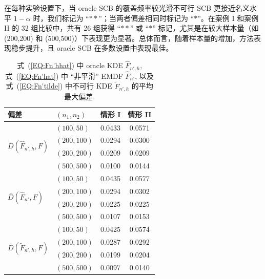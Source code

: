 \documentclass[a4paper,openay,14pt]{ctexbook}
\numberwithin{equation}{section}
\numberwithin{lem}{section}
\begin{document}
在每种实验设置下，当 oracle SCB 的覆盖频率较光滑不可行 SCB 更接近名义水平 \(1-\alpha\) 时，我们标记为 “$\ast\ast$”；当两者偏差相同时标记为 “$\ast$”。在案例 I 和案例 II 的 32 组比较中，共有 26 组获得 “$\ast\ast$” 或 “$\ast$” 标记，尤其是在较大样本量（如 (200,200) 和 (500,500)）下表现更为显著。总体而言，随着样本量的增加，方法表现稳步提升，且 oracle SCB 在多数设置中表现最佳。
{
\setlength{\tabcolsep}{10pt}
\renewcommand{\arraystretch}{1.3}
\begin{table}[htbp]
    \centering
    \caption{式~(\ref{EQ:Fn'hhat}) 中 oracle KDE $\hat{F}_{n',h}$, 式~(\ref{EQ:Fn'hat}) 中 ``非平滑'' EMDF $\hat{F}_{n'}$, 以及式~(\ref{EQ:Fn'tilde}) 中不可行 KDE $\tilde{F}_{n',h}$ 的平均最大偏差.
}
    \label{tab:Dbar}
    \begin{tabular}{llcc}
        \toprule
        偏差 & $(n_1,n_2)$ & 情形 I & 情形 II \\
        \midrule
        \multirow{4}{*}{$\bar{D}(\hat{F}_{n',h},F)$} 
            & $(100,50)$    & 0.0433 & 0.0571\\
            & $(200,100)$   & 0.0294 & 0.0300 \\
            & $(200,200)$   & 0.0209 & 0.0209 \\
            & $(500,500)$   & 0.0100 & 0.0144 \\
        \midrule
        \multirow{4}{*}{$\bar{D}(\hat{F}_{n'},F)$} 
            & $(100,50)$    & 0.0435 & 0.0577\\
            & $(200,100)$   & 0.0294 & 0.0302 \\
            & $(200,200)$   & 0.0225 & 0.0225 \\
            & $(500,500)$   & 0.0107 & 0.0153\\
        \midrule
        \multirow{4}{*}{$\bar{D}(\tilde{F}_{n',h},F)$} 
            & $(100,50)$    & 0.0425 & 0.0574 \\
            & $(200,100)$   & 0.0287 & 0.0292 \\
            & $(200,200)$   & 0.0199 & 0.0204 \\
            & $(500,500)$   & 0.0097 & 0.0140\\
        \bottomrule
    \end{tabular}
\end{table}
}
\end{document}
